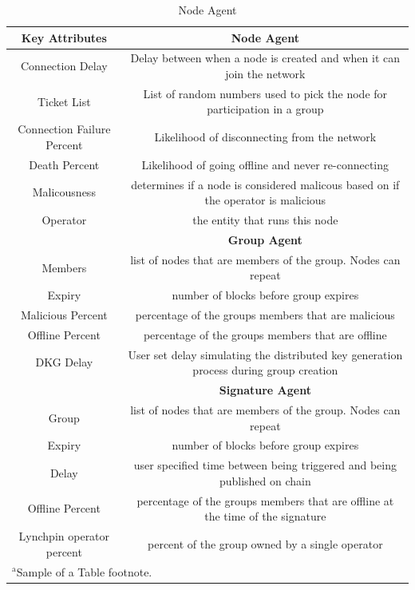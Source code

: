 \documentclass[conference]{IEEEtran}
\begin{document}
\newpage
\begin{table}[htbp]
    \caption{Node Agent}
    \begin{center}
    \begin{tabular}{|c|c|}
    \cline{1-2} 
    \textbf{Key Attributes}&{\textbf{Node Agent}} \\
    \cline{1-2} 
    \hline
    Connection Delay & Delay between when a node is created and when it can join the network \\
    Ticket List & List of random numbers used to pick the node for participation in a group\\
    Connection Failure Percent & Likelihood of disconnecting from the network\\
    Death Percent & Likelihood of going offline and never re-connecting\\
    Malicousness & determines if a node is considered malicous based on if the operator is malicious\\
    Operator  & the entity that runs this node\\
    \hline
    \textbf{ }&\textbf{Group Agent} \\
    \hline
    Members & list of nodes that are members of the group. Nodes can repeat \\
    Expiry & number of blocks before group expires\\
    Malicious Percent & percentage of the groups members that are malicious\\
    Offline Percent & percentage of the groups members that are offline\\
    DKG Delay & User set delay simulating the distributed key generation process during group creation\\
    \hline
    \textbf{ }&\textbf{Signature Agent} \\
    \hline
    Group & list of nodes that are members of the group. Nodes can repeat \\
    Expiry & number of blocks before group expires\\
    Delay &  user specified time between being triggered and being published on chain\\
    Offline Percent & percentage of the groups members that are offline at the time of the signature\\
    Lynchpin operator percent & percent of the group owned by a single operator\\
    \hline
    \multicolumn{2}{l}{$^{\mathrm{a}}$Sample of a Table footnote.}
    \end{tabular}
    \label{agent_table}
    \end{center}
    \end{table}
\end{document}
